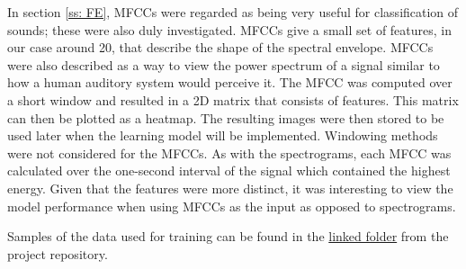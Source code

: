\documentclass[class=report,11pt,crop=false]{standalone}
\begin{document}
In section \ref{ss: FE}, MFCCs were regarded as being very useful for classification of sounds; these were also duly investigated. MFCCs give a small set of features, in our case around 20, that describe the shape of the spectral envelope. MFCCs were also described as a way to view the power spectrum of a signal similar to how a human auditory system would perceive it. The MFCC was computed over a short window and resulted in a 2D matrix that consists of features. This matrix can then be plotted as a heatmap. The resulting images were then stored to be used later when the learning model will be implemented. Windowing methods were not considered for the MFCCs. As with the spectrograms, each MFCC was calculated over the one-second interval of the signal which contained the highest energy. Given that the features were more distinct, it was interesting to view the model performance when using MFCCs as the input as opposed to spectrograms. 

Samples of the data used for training can be found in the \href{https://github.com/rothdu/EEE4114F-Project/tree/main/Training-data}{linked folder} from the project repository.


\ifstandalone

\printnoidxglossary[type=\acronymtype,nonumberlist]
\fi
\end{document}
